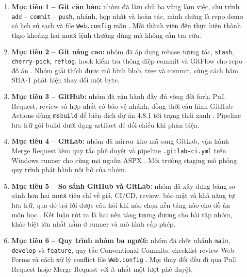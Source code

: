 \begin{enumerate}
\item \textbf{Mục tiêu 1 -- Git căn bản:} nhóm đã làm chủ ba vùng làm việc, chu trình \verb|add| -- \verb|commit| -- \verb|push|, nhánh, hợp nhất và hoàn tác, minh chứng là repo demo có lịch sử sạch và file \texttt{Web.config} mẫu \cite{progit}.
Mỗi thành viên đều thực hiện thành thạo khoảng hai mươi lệnh thường dùng mà không cần tra cứu.
\item \textbf{Mục tiêu 2 -- Git nâng cao:} nhóm đã áp dụng rebase tương tác, \verb|stash|, \verb|cherry-pick|, \verb|reflog|, hook kiểm tra thông điệp commit và GitFlow cho repo đồ án \cite{progit,gitflow,convcommits}.
Nhóm giải thích được mô hình blob, tree và commit, cùng cách băm SHA-1 phát hiện thay đổi một byte.
\item \textbf{Mục tiêu 3 -- GitHub:} nhóm đã vận hành đầy đủ vòng đời fork, Pull Request, review và hợp nhất có bảo vệ nhánh, đồng thời cấu hình GitHub Actions dùng \verb|msbuild| để biên dịch dự án 4.8.1 tới trạng thái xanh \cite{githubdocs,ghactions,msmsbuild}.
Pipeline lưu trữ gói build dưới dạng artifact để đối chiếu khi phản biện.
\item \textbf{Mục tiêu 4 -- GitLab:} nhóm đã mirror kho mã sang GitLab, vận hành Merge Request kèm quy tắc phê duyệt và pipeline \texttt{.gitlab-ci.yml} trên Windows runner cho cùng mã nguồn ASPX \cite{gitlabdocs,gitlabci}.
Môi trường staging mô phỏng quy trình phát hành nội bộ của nhóm.
\item \textbf{Mục tiêu 5 -- So sánh GitHub và GitLab:} nhóm đã xây dựng bảng so sánh hơn hai mươi tiêu chí về giá, CI/CD, review, bảo mật và khả năng tự lưu trữ, qua đó trả lời được câu hỏi khi nào chọn nền tảng nào cho đồ án môn học \cite{githubdocs,gitlabdocs,atlassiangit}.
Kết luận rút ra là hai nền tảng tương đương cho bài tập nhóm, khác biệt lớn nhất nằm ở runner và mô hình cấp phép.
\item \textbf{Mục tiêu 6 -- Quy trình nhóm ba người:} nhóm đã chốt nhánh \texttt{main}, \texttt{develop} và \texttt{feature}, quy tắc Conventional Commits, checklist review Web Forms và cách xử lý conflict file \texttt{Web.config} \cite{gitflow,convcommits,msnetfx}.
Mọi thay đổi đều đi qua Pull Request hoặc Merge Request với ít nhất một lượt phê duyệt.
\end{enumerate}

